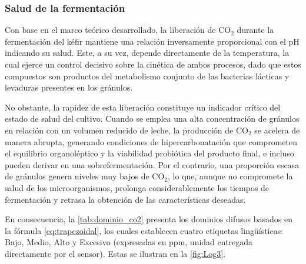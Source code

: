 \subsubsection{Salud de la fermentación}

Con base en el marco teórico desarrollado, la liberación de $\text{CO}_2$ durante la fermentación del
kéfir mantiene una relación inversamente proporcional con el pH indicando su salud. Este, a su vez, 
depende directamente de la temperatura, la cual ejerce un control decisivo sobre la cinética de 
ambos procesos, dado que estos compuestos son productos del metabolismo 
conjunto de las bacterias lácticas y levaduras presentes en los gránulos.

No obstante, la rapidez de esta liberación constituye un indicador crítico del estado de salud del 
cultivo. Cuando se emplea una alta concentración de gránulos en relación con un volumen reducido de leche, 
la producción de $\text{CO}_2$ se acelera de manera abrupta, generando condiciones de hipercarbonatación que 
comprometen el equilibrio organoléptico y la viabilidad probiótica del producto final, e incluso pueden 
derivar en una sobrefermentación. Por el contrario, una proporción escasa de 
gránulos genera niveles muy bajos de $\text{CO}_2$, lo que, aunque no compromete la salud de los microorganismos, 
prolonga considerablemente los tiempos de fermentación y retrasa la obtención de las características 
deseadas.

En consecuencia, la \cref{tab:dominio_co2} presenta los dominios difusos basados en la fórmula \eqref{eq:trapezoidal}, 
los cuales establecen cuatro etiquetas lingüísticas: Bajo, Medio, Alto y 
Excesivo (expresadas en ppm, unidad entregada directamente por el sensor). Estas se ilustran en la \cref{fig:Log3}.

